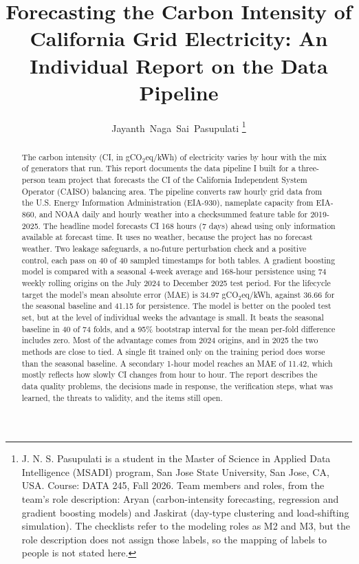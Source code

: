 \documentclass[10pt,journal,compsoc]{IEEEtran}
\begin{document}
\setlength{\tabcolsep}{2.5pt}

\title{Forecasting the Carbon Intensity of California Grid Electricity: An Individual Report on the Data Pipeline}

\author{Jayanth~Naga~Sai~Pasupulati
\thanks{J. N. S. Pasupulati is a student in the Master of Science in Applied Data Intelligence (MSADI) program, San Jose State University, San Jose, CA, USA. Course: DATA 245, Fall 2026. Team members and roles, from the team's role description: Aryan (carbon-intensity forecasting, regression and gradient boosting models) and Jaskirat (day-type clustering and load-shifting simulation). The checklists refer to the modeling roles as M2 and M3, but the role description does not assign those labels, so the mapping of labels to people is not stated here.}}


\maketitle

\begin{abstract}
The carbon intensity (CI, in gCO$_2$eq/kWh) of electricity varies by hour with the mix of generators that run. This report documents the data pipeline I built for a three-person team project that forecasts the CI of the California Independent System Operator (CAISO) balancing area. The pipeline converts raw hourly grid data from the U.S. Energy Information Administration (EIA-930), nameplate capacity from EIA-860, and NOAA daily and hourly weather into a checksummed feature table for 2019-2025. The headline model forecasts CI 168 hours (7 days) ahead using only information available at forecast time. It uses no weather, because the project has no forecast weather. Two leakage safeguards, a no-future perturbation check and a positive control, each pass on 40 of 40 sampled timestamps for both tables. A gradient boosting model is compared with a seasonal 4-week average and 168-hour persistence using 74 weekly rolling origins on the July 2024 to December 2025 test period. For the lifecycle target the model's mean absolute error (MAE) is 34.97 gCO$_2$eq/kWh, against 36.66 for the seasonal baseline and 41.15 for persistence. The model is better on the pooled test set, but at the level of individual weeks the advantage is small. It beats the seasonal baseline in 40 of 74 folds, and a 95\% bootstrap interval for the mean per-fold difference includes zero. Most of the advantage comes from 2024 origins, and in 2025 the two methods are close to tied. A single fit trained only on the training period does worse than the seasonal baseline. A secondary 1-hour model reaches an MAE of 11.42, which mostly reflects how slowly CI changes from hour to hour. The report describes the data quality problems, the decisions made in response, the verification steps, what was learned, the threats to validity, and the items still open.
\end{abstract}
\end{document}
